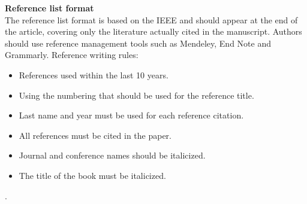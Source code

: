 \documentclass{article}
\begin{document}
\textbf{Reference list format}\\
The reference list format is based on the IEEE and should appear at the end of the article, covering only the literature actually cited in the manuscript. Authors should use reference management tools such as Mendeley, End Note and Grammarly. Reference writing rules:
\begin{itemize}
	\item  References used within the last 10 years.
	\item Using the numbering that should be used for the reference title.
	\item Last name and year must be used for each reference citation.
	\item All references must be cited in the paper.
	\item Journal and conference names should be italicized.
	\item  The title of the book must be italicized.
\end{itemize}
.
\end{document}
